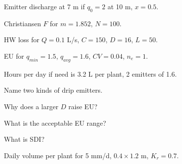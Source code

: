 \begin{exlist}
\item Emitter discharge at 7 m if $q_0=2$ at 10 m, $x=0.5$.
\item Christiansen $F$ for $m=1.852$, $N=100$.
\item HW loss for $Q=0.1$ L/s, $C=150$, $D=16$, $L=50$.
\item EU for $q_{min}=1.5$, $q_{avg}=1.6$, $CV=0.04$, $n_e=1$.
\item Hours per day if need is 3.2 L per plant, 2 emitters of 1.6.
\item Name two kinds of drip emitters.
\item Why does a larger $D$ raise EU?
\item What is the acceptable EU range?
\item What is SDI?
\item Daily volume per plant for 5 mm/d, $0.4\times1.2$ m, $K_r=0.7$.
\end{exlist}
